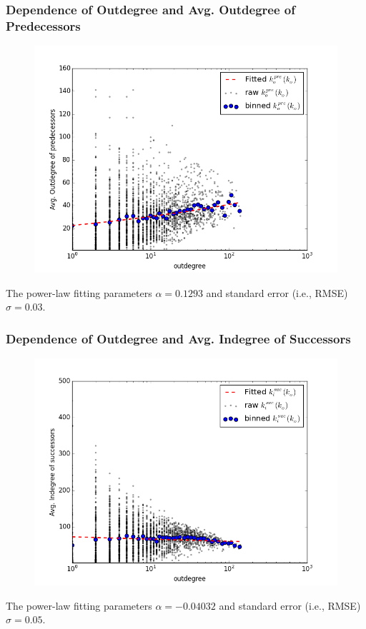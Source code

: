 \documentclass{beamer}
\begin{document}
\begin{frame}
\frametitle{Dependence of Outdegree and Avg. Outdegree of Predecessors}
\begin{figure}
\includegraphics[width=0.8\linewidth]{figs/pre_out_out_d.png}
\end{figure}
\small{The power-law fitting parameters $\alpha=0.1293$ and standard error (i.e., RMSE) $\sigma= 0.03$.}
\end{frame}

\begin{frame}
\frametitle{Dependence of Outdegree and Avg. Indegree of Successors}
\begin{figure}
\includegraphics[width=0.8\linewidth]{figs/suc_in_out_d.png}
\end{figure}
\small{The power-law fitting parameters $\alpha=-0.04032$ and standard error (i.e., RMSE) $\sigma=0.05$.}
\end{frame}
\end{document}
